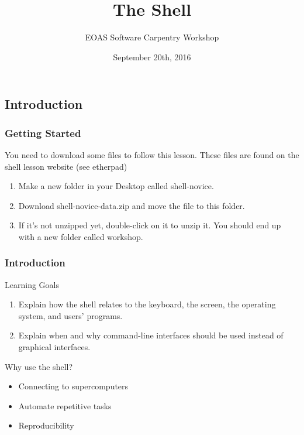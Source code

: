\documentclass{beamer}
\title[Shell Lesson]{The Shell}
\subtitle[]{EOAS Software Carpentry Workshop }
\date[Sep 2016]{September 20th, 2016}
\begin{document}






\begin{frame}[plain]

\titlepage


\end{frame}




\subsection*{Introduction}

\begin{frame}
\frametitle{Getting Started}

You need to download some files to follow this lesson. These files are found on the shell lesson website (see etherpad)

\begin{enumerate}
\item Make a new folder in your Desktop called shell-novice.
\item Download shell-novice-data.zip and move the file to this folder.
\item If it's not unzipped yet, double-click on it to unzip it. You should end up with a new folder called workshop.
\end{enumerate}
\end{frame}


\begin{frame}
\frametitle{Introduction}
\begin{block}{Learning Goals}
\begin{enumerate}

 \item   Explain how the shell relates to the keyboard, the screen, the operating system, and users' programs.
 \item   Explain when and why command-line interfaces should be used instead of graphical interfaces.

\end{enumerate}
\end{block}
\pause
\begin{block}{Why use the shell?}
\begin{itemize}
\pause
\item Connecting to supercomputers
\pause
\item Automate repetitive tasks
\pause
\item Reproducibility
\end{itemize}
\end{block}
\end{frame}
\end{document}
